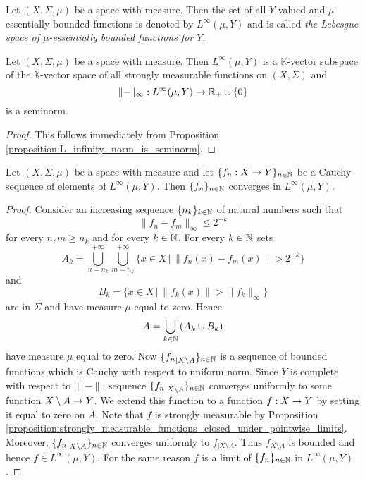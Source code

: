 \begin{definition}
Let $(X,\Sigma,\mu)$ be a space with measure. Then the set of all $Y$-valued and $\mu$-essentially bounded functions is denoted by $L^{\infty}(\mu,Y)$ and is called \textit{the Lebesgue space of $\mu$-essentially bounded functions for $Y$}.
\end{definition}

\begin{corollary}\label{corollary:L_infinity_is_seminormed_topological_vector_space}
Let $(X,\Sigma,\mu)$ be a space with measure. Then $L^{\infty}(\mu,Y)$ is a $\mathbb{K}$-vector subspace of the $\mathbb{K}$-vector space of all strongly measurable functions on $(X,\Sigma)$ and 
$$\lVert -\rVert_{\infty}:L^{\infty}(\mu,Y)\rightarrow {\mathbb R}_+\cup \{0\}$$
is a seminorm.
\end{corollary}
\begin{proof}
This follows immediately from Proposition \ref{proposition:L_infinity_norm_is_seminorm}.
\end{proof}

\begin{theorem}[Riesz]\label{theorem:Riesz_theorem_for_L_infinity}
Let $(X,\Sigma,\mu)$ be a space with measure and let $\{f_n:X\rightarrow Y\}_{n\in {\mathbb N}}$ be a Cauchy sequence of elements of $L^{\infty}(\mu,Y)$. Then $\{f_n\}_{n\in {\mathbb N}}$ converges in $L^{\infty}(\mu,Y)$. 
\end{theorem}
\begin{proof}
Consider an increasing sequence $\{n_k\}_{k\in {\mathbb N}}$ of natural numbers such that
$$\lVert f_{n} - f_{m}\rVert_{\infty} \leq 2^{-k}$$
for every $n,m\geq n_k$ and for every $k \in {\mathbb N}$. For every $k\in {\mathbb N}$ sets
$$A_{k} = \bigcup_{n=n_k}^{+\infty}\bigcup_{m=n_k}^{+\infty}\big\{x\in X\,\big|\,\lVert f_{n}(x) - f_{m}(x) \rVert > 2^{-k} \big\}$$
and
$$B_k = \big\{x\in X\,\big|\,\lVert f_k(x) \rVert > \lVert f_k \rVert_{\infty}\big\}$$
are in $\Sigma$ and have measure $\mu$ equal to zero. Hence
$$A = \bigcup_{k\in {\mathbb N}}\left(A_k\cup B_k\right)$$
have measure $\mu$ equal to zero. Now $\{{f_n}_{\mid X\setminus A}\}_{n\in {\mathbb N}}$ is a sequence of bounded functions which is Cauchy with respect to uniform norm. Since $Y$ is complete with respect to $\lVert-\rVert$, sequence $\{{f_n}_{\mid X\setminus A}\}_{n\in {\mathbb N}}$ converges uniformly to some function $X\setminus A\rightarrow Y$. We extend this function to a function $f:X\rightarrow Y$ by setting it equal to zero on $A$. Note that $f$ is strongly measurable by Proposition \ref{proposition:strongly_measurable_functions_closed_under_pointwise_limits}. Moreover, $\{{f_n}_{\mid X\setminus A}\}_{n\in {\mathbb N}}$ converges uniformly to $f_{\mid X\setminus A}$. Thus $f_{X\setminus A}$ is bounded and hence $f\in L^{\infty}(\mu,Y)$. For the same reason $f$ is a limit of $\{f_n\}_{n\in {\mathbb N}}$ in $L^{\infty}(\mu,Y)$.
\end{proof}













\small



